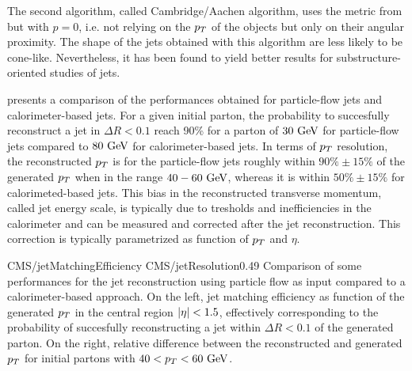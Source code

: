         The second algorithm, called Cambridge/Aachen algorithm, uses the metric from
         but with $p = 0$, i.e. not relying on the $p_T$ of
        the objects but only on their angular proximity. The shape of the jets obtained with
        this algorithm are less likely to be cone-like. Nevertheless, it has been found to
        yield better results for substructure-oriented studies of jets.

         presents a comparison of the performances obtained
        for particle-flow jets and calorimeter-based jets. For a given initial parton, the
        probability to succesfully reconstruct a jet in $\Delta R < 0.1$ reach 90\% for
        a parton of $30~\text{GeV}$ for particle-flow jets compared to $80~\text{GeV}$ for
        calorimeter-based jets. In terms of $p_T$ resolution, the reconstructed $p_T$ is
        for the particle-flow jets roughly within $90\% \pm 15\%$ of the generated $p_T$
        when in the range $40-60~\text{GeV}$, whereas it is within $50\% \pm 15\%$ for
        calorimeted-based jets. This bias in the reconstructed transverse momentum, called
        jet energy scale, is typically due to tresholds and inefficiencies in the calorimeter
        and can be measured and corrected after the jet reconstruction. This correction is
        typically parametrized as function of $p_T$ and $\eta$.


        {CMS/jetMatchingEfficiency}
        {CMS/jetResolution}{0.49}
        {Comparison of some performances for the jet reconstruction using particle flow as
        input compared to a calorimeter-based approach. On the left, jet matching efficiency
        as function of the generated $p_T$ in the central region $\left| \eta \right| < 1.5$, effectively
        corresponding to the probability of succesfully reconstructing a jet within
        $\Delta R < 0.1$ of the generated parton. On the right, relative difference between
        the reconstructed and generated $p_T$ for initial partons with $40 < p_T < 60~\text{GeV}$.}


